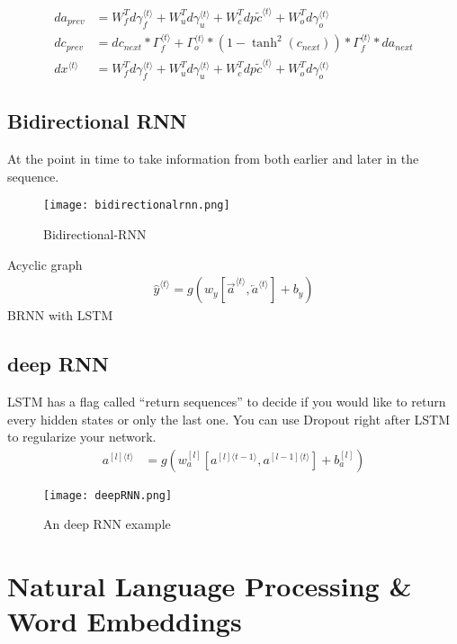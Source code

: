 \begin{align}
da_{prev} &= W_f^T d\gamma_f^{\langle t \rangle} + W_u^T   d\gamma_u^{\langle t \rangle}+ W_c^T dp\widetilde c^{\langle t \rangle} + W_o^T d\gamma_o^{\langle t \rangle}\\
dc_{prev} &= dc_{next}*\Gamma_f^{\langle t \rangle} + \Gamma_o^{\langle t \rangle} * (1- \tanh^2(c_{next}))*\Gamma_f^{\langle t \rangle}*da_{next}\\
dx^{\langle t \rangle} &= W_f^T d\gamma_f^{\langle t \rangle} + W_u^T  d\gamma_u^{\langle t \rangle}+ W_c^T dp\widetilde c^{\langle t \rangle} + W_o^T d\gamma_o^{\langle t \rangle}
\end{align}

%
\subsection{Bidirectional RNN}
At the point in time to take information from both earlier and later in the sequence.
\begin{figure}[h]
    \centering
    \texttt{[image: bidirectionalrnn.png]}
    \caption{Bidirectional-RNN}
    \label{fig:bidirectionalRNN}
\end{figure}
Acyclic graph\\
\begin{align}
\hat{y}^{\langle t \rangle} = g(w_y[\overrightarrow{a}^{\langle t \rangle}, \overleftarrow{a}^{\langle t \rangle}] + b_y)
\end{align}
BRNN with LSTM

%
\subsection{deep RNN}
LSTM has a flag called ``return sequences'' to decide if you would like to return every hidden states or only the last one.
You can use Dropout right after LSTM to regularize your network.
\begin{align}
a^{[l]\langle t \rangle} &= g(w_{a}^{[l]} [a^{[l]\langle t-1 \rangle}, a^{[l-1]\langle t \rangle}] + b_a^{[l]})
\end{align}
\begin{figure}[h]
    \centering
    \texttt{[image: deepRNN.png]}
    \caption{An deep RNN example}
    \label{fig:deepRNN}
\end{figure}


\section{Natural Language Processing \& Word Embeddings}

